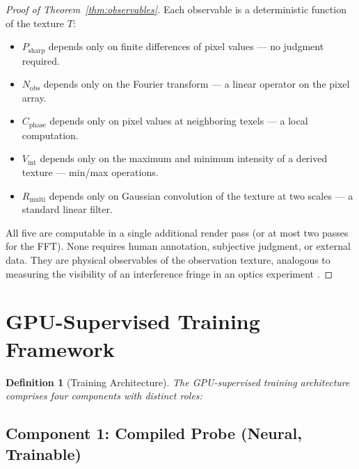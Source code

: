 \documentclass[11pt,twocolumn,a4paper]{article}
\newtheorem{definition}[theorem]{Definition}
\begin{document}
\begin{proof}[Proof of Theorem~\ref{thm:observables}]
Each observable is a deterministic function of the texture $T$:
\begin{itemize}[leftmargin=*]
\item $P_{\mathrm{sharp}}$ depends only on finite differences of
  pixel values --- no judgment required.
\item $N_{\mathrm{obs}}$ depends only on the Fourier transform ---
  a linear operator on the pixel array.
\item $C_{\mathrm{phase}}$ depends only on pixel values at
  neighboring texels --- a local computation.
\item $V_{\mathrm{int}}$ depends only on the maximum and minimum
  intensity of a derived texture --- min/max operations.
\item $R_{\mathrm{multi}}$ depends only on Gaussian convolution
  of the texture at two scales --- a standard linear filter.
\end{itemize}
All five are computable in a single additional render pass (or at most
two passes for the FFT). None requires human annotation, subjective
judgment, or external data. They are physical observables of the
observation texture, analogous to measuring the visibility of an
interference fringe in an optics experiment
\citep{bornwolf1999,michelson1891}. \qedhere
\end{proof}



\section{GPU-Supervised Training Framework}
\label{sec:training}

\begin{definition}[Training Architecture]
\label{def:training-arch}
The GPU-supervised training architecture comprises four components
with distinct roles:
\end{definition}

\subsection{Component 1: Compiled Probe (Neural, Trainable)}
\end{document}
